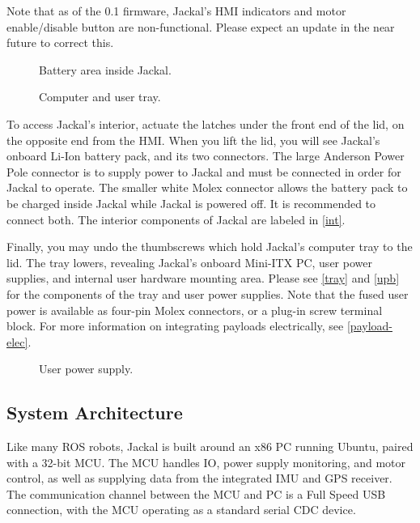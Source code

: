 \documentclass[]{clearpath-manual}
\begin{document}
\begin{warning}
Note that as of the 0.1 firmware, Jackal's HMI indicators and motor enable/disable button are
non-functional. Please expect an update in the near future to correct this.
\end{warning}

\begin{figure}[pt]
  \centering
  \def\svgwidth{12cm}
  
  \caption{Battery area inside Jackal.}
  \label{int}
\end{figure}

\begin{figure}[pb]
  \centering
  \def\svgwidth{14cm}
  
  \caption{Computer and user tray.}
  \label{tray}
\end{figure}

To access Jackal's interior, actuate the latches under the front end of the lid, on the opposite end from
the HMI. When you lift the lid, you will see Jackal's onboard Li-Ion battery pack, and its two connectors.
The large Anderson Power Pole connector is to supply power to Jackal and must be connected in order for
Jackal to operate. The smaller white Molex connector allows the battery pack to be charged inside Jackal 
while Jackal is powered off. It is recommended to connect both. The interior components of Jackal are
labeled in \autoref{int}.

Finally, you may undo the thumbscrews which hold Jackal's computer tray to the lid. The tray lowers,
revealing Jackal's onboard Mini-ITX PC, user power supplies, and internal user hardware mounting area.
Please see \autoref{tray} and \autoref{upb} for the components of the tray and user power supplies.
Note that the fused user power is available as four-pin Molex connectors, or a plug-in screw terminal
block. For more information on integrating payloads electrically, see \autoref{payload-elec}.

\begin{figure}[hb]
  \centering
  \def\svgwidth{15cm}
  
  \caption{User power supply.}
  \label{upb}
\end{figure}

\subsection{System Architecture}

Like many ROS robots, Jackal is built around an x86 PC running Ubuntu, paired with a
32-bit MCU. The MCU handles IO, power supply monitoring, and motor control, as well as
supplying data from the integrated IMU and GPS receiver. The communication channel
between the MCU and PC is a Full Speed USB connection, with the MCU operating as a
standard serial CDC device.
\end{document}
